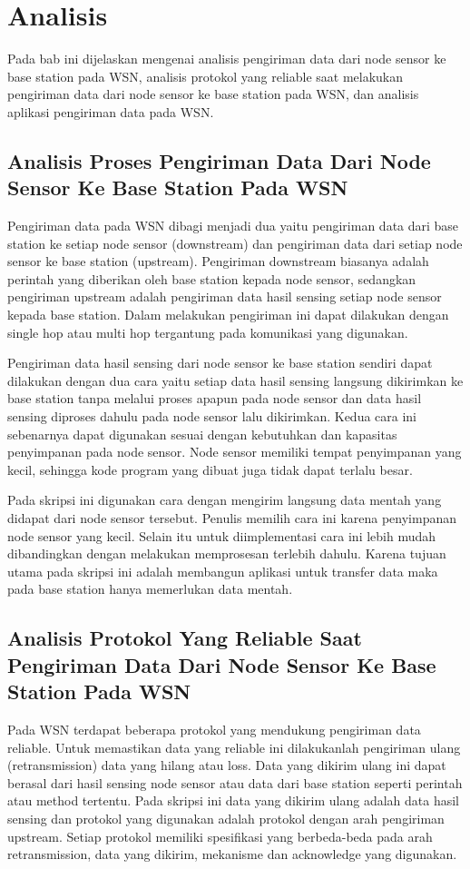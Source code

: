 \chapter{Analisis}
\label{chap:analisis}

Pada bab ini dijelaskan mengenai analisis pengiriman data dari node sensor ke base station pada WSN, analisis protokol yang reliable saat melakukan pengiriman data dari node sensor ke base station pada WSN, dan analisis aplikasi pengiriman data pada WSN.

\section{Analisis Proses Pengiriman Data Dari Node Sensor Ke Base Station Pada WSN}
Pengiriman data pada WSN dibagi menjadi dua yaitu pengiriman data dari base station ke setiap node sensor (downstream) dan pengiriman data dari setiap node sensor ke base station (upstream). Pengiriman downstream biasanya adalah perintah yang diberikan oleh base station kepada node sensor, sedangkan pengiriman upstream adalah pengiriman data hasil sensing setiap node sensor kepada base station. Dalam melakukan pengiriman ini dapat dilakukan dengan single hop atau multi hop tergantung pada komunikasi yang digunakan. 

Pengiriman data hasil sensing dari node sensor ke base station sendiri dapat dilakukan dengan dua cara yaitu setiap data hasil sensing langsung dikirimkan ke base station tanpa melalui proses apapun pada node sensor dan data hasil sensing diproses dahulu pada node sensor lalu dikirimkan. Kedua cara ini sebenarnya dapat digunakan sesuai dengan kebutuhkan dan kapasitas penyimpanan pada node sensor. Node sensor memiliki tempat penyimpanan yang kecil, sehingga kode program yang dibuat juga tidak dapat terlalu besar. 

Pada skripsi ini digunakan cara dengan mengirim langsung data mentah yang didapat dari node sensor tersebut. Penulis memilih cara ini karena penyimpanan node sensor yang kecil. Selain itu untuk diimplementasi cara ini lebih mudah dibandingkan dengan melakukan memprosesan terlebih dahulu. Karena tujuan utama pada skripsi ini adalah membangun aplikasi untuk transfer data maka pada base station hanya memerlukan data mentah.

\section{Analisis Protokol Yang Reliable Saat Pengiriman Data Dari Node Sensor Ke Base Station Pada WSN}
Pada WSN terdapat beberapa protokol yang mendukung pengiriman data reliable. Untuk memastikan data yang reliable ini dilakukanlah pengiriman ulang (retransmission) data yang hilang atau loss. Data yang dikirim ulang ini dapat berasal dari hasil sensing node sensor atau data dari base station seperti perintah atau method tertentu. Pada skripsi ini data yang dikirim ulang adalah data hasil sensing dan protokol yang digunakan adalah protokol dengan arah pengiriman upstream. Setiap protokol memiliki spesifikasi yang berbeda-beda pada arah retransmission, data yang dikirim, mekanisme dan acknowledge yang digunakan. 

